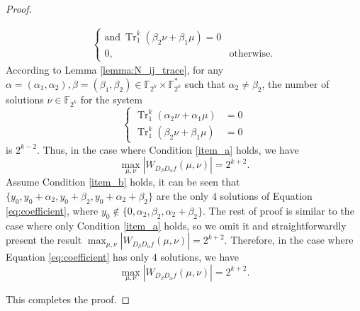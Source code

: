 \documentclass{article}
\newcommand{\F}{\mathbb{F}}
\newcommand{\0}{\textbf{0}}
\newcommand{\1}{\textbf{1}}
\newcommand{\TRACE}{\operatorname{Tr}_1^k}
\theoremstyle{plain}
\begin{document}
\begin{proof}
\begin{enumerate}[label=\textbf{Case \arabic*},wide = 0pt]
\begin{align}
\begin{cases}
                    \text{and}~\TRACE\left(\beta_2\nu+\beta_1 \mu\right)=0 \\
                    0,~&\text{otherwise}.
                \end{cases}
            \end{align}
            According to Lemma \ref{lemma:N_ij_trace}, for any $\alpha=(\alpha_1,\alpha_2),\beta=(\beta_1,\beta_2)\in\F_{2^k}\times\F_{2^k}^*$ such that $\alpha_2\ne\beta_2$, the number of solutions $\nu\in\F_{2^k}$ for the system
            \begin{equation}\label{eq:max_foursolution_condition}
                \left\{
                \begin{alignedat}{2}
                    \TRACE\left(\alpha_2\nu+\alpha_1\mu\right)&=0\\
                    \TRACE\left(\beta_2\nu +\beta_1 \mu\right)&=0
                \end{alignedat}
                \right.
            \end{equation}
            is $2^{k-2}$.
            Thus, in the case where Condition \ref{item_a} holds, we have
            \[\max_{\mu,\nu}|W_{D_{\beta}D_{\alpha}f}(\mu,\nu)|=2^{k+2}.\]
            Assume Condition \ref{item_b} holds, 
            it can be seen that $\{y_0,y_0+\alpha_2,y_0+\beta_2,y_0+\alpha_2+\beta_2\}$
            are the only $4$ solutions of
            Equation \eqref{eq:coefficient}, where $y_0\notin\{0, \alpha_2, \beta_2, \alpha_2+\beta_2\}$. 
            The rest of proof  is similar to the case where only Condition \ref{item_a} holds, so we omit it and 
            straightforwardly present the result $\max_{\mu,\nu}|W_{D_{\beta}D_{\alpha}f}(\mu,\nu)|=2^{k+2}$. 
            Therefore, in the case where Equation \eqref{eq:coefficient} has only $4$ solutions, we have 
            \[\max_{\mu,\nu}|W_{D_{\beta}D_{\alpha}f}(\mu,\nu)|=2^{k+2}.\] 
        \end{enumerate}
        This completes the proof.
    \end{proof}
\end{document}
